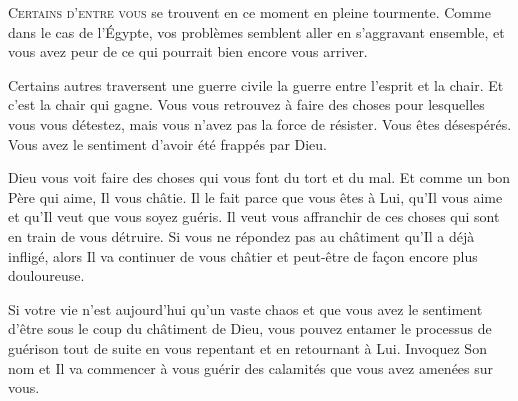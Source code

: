 \dvrule






\lettrine{C}{ertains d'entre vous} se trouvent en ce moment
 en pleine tourmente.
 Comme dans le cas de l'Égypte, vos problèmes semblent aller
 en s'aggravant ensemble, et vous avez peur de ce qui pourrait
 bien encore vous arriver. 

Certains autres traversent une guerre civile
 \ocadr la guerre entre l'esprit et la chair.
 Et c'est la chair qui gagne. Vous vous retrouvez à faire des choses
 pour lesquelles vous vous détestez, mais vous n'avez pas la force
 de résister. Vous êtes désespérés. Vous avez le sentiment
 d'avoir été frappés par Dieu. 



Dieu vous voit faire des choses qui vous font du tort et du mal.
 Et comme un bon Père qui aime, Il vous châtie.
 Il le fait parce que vous êtes à Lui, qu'Il vous aime
 et qu'Il veut que vous soyez guéris.
 Il veut vous affranchir de ces choses qui sont en train de vous détruire.
 Si vous ne répondez pas au châtiment qu'Il a déjà infligé,
 alors Il va continuer de vous châtier
 \ocadr et peut-être de façon encore plus douloureuse. 

Si votre vie n'est aujourd'hui qu'un vaste chaos et que vous avez le sentiment
 d'être sous le coup du châtiment de Dieu, vous pouvez entamer le processus
 de guérison tout de suite en vous repentant et en retournant à Lui.
 Invoquez Son nom et Il va commencer à vous guérir des calamités
 que vous avez amenées sur vous. 

\dvrule


